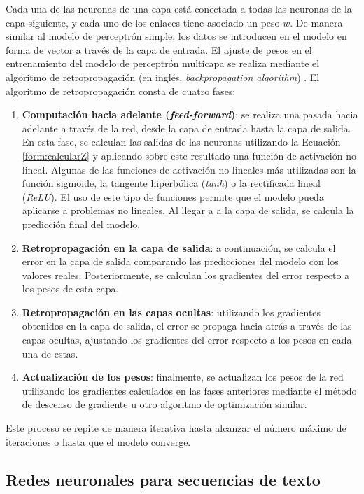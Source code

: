 \documentclass[11pt,spanish,listoffigures,listoftables]{tfgetsinf}
\begin{document}
Cada una de las neuronas de una capa está conectada a todas las neuronas de la capa siguiente, y cada uno de los enlaces tiene asociado un peso $w$. De manera similar al modelo de perceptrón simple, los datos se introducen en el modelo en forma de vector a través de la capa de entrada. El ajuste de pesos en el entrenamiento del modelo de perceptrón multicapa se realiza mediante el algoritmo de retropropagación (en inglés, \textit{backpropagation algorithm}) \cite{Rojas1996}. El algoritmo de retropropagación consta de cuatro fases:

\begin{enumerate}
	\item \textbf{Computación hacia adelante (\textit{feed-forward})}: se realiza una pasada hacia adelante a través de la red, desde la capa de entrada hasta la capa de salida. En esta fase, se calculan las salidas de las neuronas utilizando la Ecuación \ref{form:calcularZ} y aplicando sobre este resultado una función de activación no lineal. Algunas de las funciones de activación no lineales más utilizadas son la función sigmoide, la tangente hiperbólica (\textit{tanh}) o la rectificada lineal (\textit{ReLU}). El uso de este tipo de funciones permite que el modelo pueda aplicarse a problemas no lineales. Al llegar a a la capa de salida, se calcula la predicción final del modelo.
	\item \textbf{Retropropagación en la capa de salida}: a continuación, se calcula el error en la capa de salida comparando las predicciones del modelo con los valores reales. Posteriormente, se calculan los gradientes del error respecto a los pesos de esta capa.
	\item \textbf{Retropropagación en las capas ocultas}: utilizando los gradientes obtenidos en la capa de salida, el error se propaga hacia atrás a través de las capas ocultas, ajustando los gradientes del error respecto a los pesos en cada una de estas.
	\item \textbf{Actualización de los pesos}: finalmente, se actualizan los pesos de la red utilizando los gradientes calculados en las fases anteriores mediante el método de descenso de gradiente u otro algoritmo de optimización similar.
\end{enumerate}

Este proceso se repite de manera iterativa hasta alcanzar el número máximo de iteraciones o hasta que el modelo converge.

\subsection{Redes neuronales para secuencias de texto}
\end{document}
